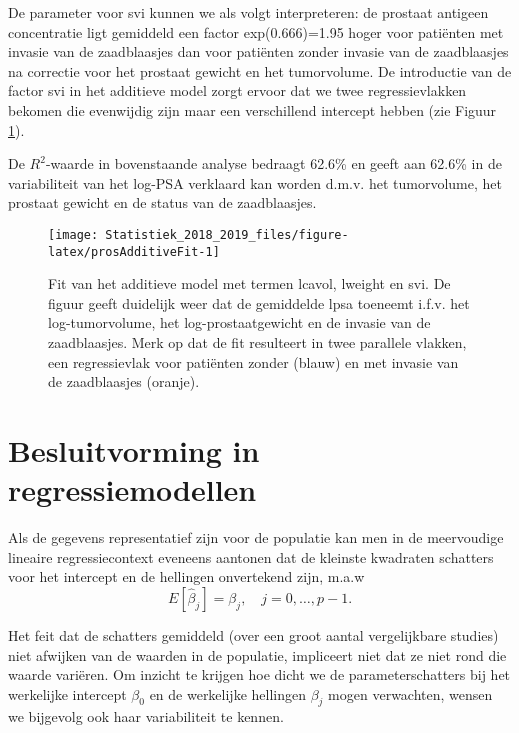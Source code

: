 \documentclass[12pt,dutch,coursenotes]{book}
\theoremstyle{definition}
\theoremstyle{definition}
\theoremstyle{definition}
\theoremstyle{remark}
\begin{document}
De parameter voor svi kunnen we als volgt interpreteren: de prostaat
antigeen concentratie ligt gemiddeld een factor exp(0.666)=1.95 hoger
voor patiënten met invasie van de zaadblaasjes dan voor patiënten zonder
invasie van de zaadblaasjes na correctie voor het prostaat gewicht en
het tumorvolume. De introductie van de factor svi in het additieve model
zorgt ervoor dat we twee regressievlakken bekomen die evenwijdig zijn
maar een verschillend intercept hebben (zie Figuur
\ref{fig:prosAdditiveFit}).

De \(R^2\)-waarde in bovenstaande analyse bedraagt 62.6\% en geeft aan
62.6\% in de variabiliteit van het log-PSA verklaard kan worden d.m.v.
het tumorvolume, het prostaat gewicht en de status van de zaadblaasjes.

\begin{figure}

{\centering \texttt{[image: Statistiek\_2018\_2019\_files/figure-latex/prosAdditiveFit-1]} 

}

\caption{Fit van het additieve model met termen lcavol, lweight en svi. De figuur geeft duidelijk weer dat de gemiddelde lpsa toeneemt i.f.v. het log-tumorvolume, het log-prostaatgewicht en de invasie van de zaadblaasjes. Merk op dat de fit resulteert in twee parallele vlakken, een regressievlak voor patiënten zonder (blauw) en met invasie van de zaadblaasjes (oranje).}\label{fig:prosAdditiveFit}
\end{figure}

\section{Besluitvorming in
regressiemodellen}\label{besluitvorming-in-regressiemodellen}

Als de gegevens representatief zijn voor de populatie kan men in de
meervoudige lineaire regressiecontext eveneens aantonen dat de kleinste
kwadraten schatters voor het intercept en de hellingen onvertekend zijn,
m.a.w \[E[\hat \beta_j]=\beta_j,\quad j=0,\ldots,p-1.\]

Het feit dat de schatters gemiddeld (over een groot aantal vergelijkbare
studies) niet afwijken van de waarden in de populatie, impliceert niet
dat ze niet rond die waarde variëren. Om inzicht te krijgen hoe dicht we
de parameterschatters bij het werkelijke intercept \(\beta_0\) en de
werkelijke hellingen \(\beta_j\) mogen verwachten, wensen we bijgevolg
ook haar variabiliteit te kennen.
\end{document}
